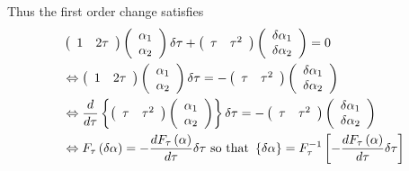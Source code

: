 \documentclass[aps,preprint]{revtex4}
\begin{document}
Thus the first order change satisfies
\begin{align}
& \left(
\begin{array}{cc}
1 & 2\tau%
\end{array}%
\right) \left(
\begin{array}{c}
\alpha _{1} \\
\alpha _{2}%
\end{array}%
\right) \delta \tau +\left(
\begin{array}{cc}
\tau & \tau ^{2}%
\end{array}%
\right) \left(
\begin{array}{c}
\delta \alpha _{1} \\
\delta \alpha _{2}%
\end{array}%
\right) =0  \notag \\
& \Leftrightarrow \left(
\begin{array}{cc}
1 & 2\tau%
\end{array}%
\right) \left(
\begin{array}{c}
\alpha _{1} \\
\alpha _{2}%
\end{array}%
\right) \delta \tau =-\left(
\begin{array}{cc}
\tau & \tau ^{2}%
\end{array}%
\right) \left(
\begin{array}{c}
\delta \alpha _{1} \\
\delta \alpha _{2}%
\end{array}%
\right)  \notag \\
& \Leftrightarrow \frac{d}{d\tau }\left\{ \left(
\begin{array}{cc}
\tau & \tau ^{2}%
\end{array}%
\right) \left(
\begin{array}{c}
\alpha _{1} \\
\alpha _{2}%
\end{array}%
\right) \right\} \delta \tau =-\left(
\begin{array}{cc}
\tau & \tau ^{2}%
\end{array}%
\right) \left(
\begin{array}{c}
\delta \alpha _{1} \\
\delta \alpha _{2}%
\end{array}%
\right)  \notag \\
& \Leftrightarrow F_{\tau }\left( \delta \mathbf{\alpha }\right) =-\frac{%
dF_{\tau }\left( \mathbf{\alpha }\right) }{d\tau }\delta \tau \text{ so that
}\left\{ \delta \mathbf{\alpha }\right\} =F_{\tau }^{-1}\left[ -\frac{%
dF_{\tau }\left( \mathbf{\alpha }\right) }{d\tau }\delta \tau \right]
\end{align}%
\end{document}
